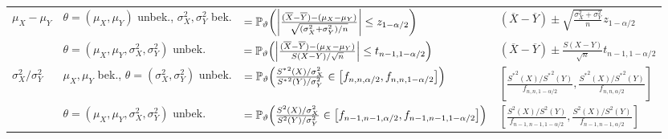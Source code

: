 \begin{landscape}
{\begin{tabular}{llll}
    \midrule
    $\mu_X - \mu_Y$ &
    $\theta = (\mu_X, \mu_Y)$ unbek., $\sigma_X^2, \sigma_Y^2$ bek. &
    $= \mathbb{P}_\vartheta\!\left(\left|\frac{(\overline{X} - \overline{Y}) - (\mu_X - \mu_Y)}
    {\sqrt{(\sigma_X^2 + \sigma_Y^2)/n}}\right| \le z_{1-\alpha/2}\right)$ &
    $(\overline{X} - \overline{Y}) \pm
    \sqrt{\frac{\sigma_X^2 + \sigma_Y^2}{n}} z_{1-\alpha/2}$\\
    \cmidrule(r){2-4}
    & $\theta = (\mu_X, \mu_Y, \sigma_X^2, \sigma_Y^2)$ unbek. &
    $= \mathbb{P}_\vartheta\!\left(\left|\frac{(\overline{X} - \overline{Y}) - (\mu_X - \mu_Y)}
    {S(X - Y)/\sqrt{n}}\right| \le t_{n-1,1-\alpha/2}\right)$ &
    $(\overline{X} - \overline{Y}) \pm
    \frac{S(X - Y)}{\sqrt{n}} t_{n-1,1-\alpha/2}$\\
    
    \midrule
    $\sigma_X^2/\sigma_Y^2$ &
    $\mu_X, \mu_Y$ bek., $\theta = (\sigma_X^2, \sigma_Y^2)$ unbek. &
    $= \mathbb{P}_\vartheta\!\left(\frac{{S^\ast}^2(X)/\sigma_X^2}{{S^\ast}^2(Y)/\sigma_Y^2} \in
    \left[f_{n,n,\alpha/2}, f_{n,n,1-\alpha/2}\right]\right)$ &
    $\left[\frac{{S^\ast}^2(X)/{S^\ast}^2(Y)}{f_{n,n,1-\alpha/2}},
    \frac{{S^\ast}^2(X)/{S^\ast}^2(Y)}{f_{n,n,\alpha/2}}\right]$\\
    \cmidrule(r){2-4}
    & $\theta = (\mu_X, \mu_Y, \sigma_X^2, \sigma_Y^2)$ unbek. &
    $= \mathbb{P}_\vartheta\!\left(\frac{S^2(X)/\sigma_X^2}{S^2(Y)/\sigma_Y^2} \in
    \left[f_{n-1,n-1,\alpha/2}, f_{n-1,n-1,1-\alpha/2}\right]\right)$ &
    $\left[\frac{S^2(X)/S^2(Y)}{f_{n-1,n-1,1-\alpha/2}},
    \frac{S^2(X)/S^2(Y)}{f_{n-1,n-1,\alpha/2}}\right]$\\
    
    \bottomrule
\end{tabular}}


    
    

\end{landscape}
